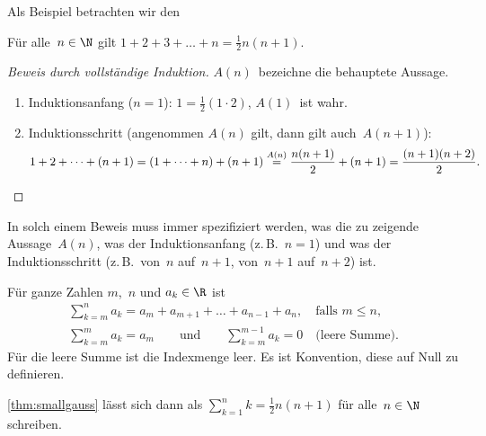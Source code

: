 \documentclass[a4paper]{article}
\begin{document}
Als Beispiel betrachten wir den

\begin{theorem}\label{thm:smallgauss}
    Für alle~$n \in \N$ gilt $1 + 2 + 3 + \dots + n = \frac{1}{2} n (n + 1)$.
\end{theorem}

\begin{proof}[Beweis durch vollständige Induktion]
    $A(n)$~bezeichne die behauptete Aussage.

    \begin{enumerate}
        \item Induktionsanfang ($n = 1$): $1 = \frac{1}{2} (1 \cdot 2)$, $A(1)$~ist wahr.
        \item Induktionsschritt (angenommen $A(n)$ gilt, dann gilt auch~$A(n + 1)$):
              \begin{equation*}
                  1 + 2 + \dots + (n + 1) = (1 + \dots + n) + (n + 1) \overset{A(n)}{=} \frac{n (n + 1)}{2} + (n + 1) = \frac{(n + 1) (n + 2)}{2}. \qedhere
              \end{equation*}
    \end{enumerate}
\end{proof}

\begin{remark}
    In solch einem Beweis muss immer spezifiziert werden, was die zu zeigende Aussage~$A(n)$, was der Induktionsanfang (z.\,B.~$n = 1$) und was der Induktionsschritt (z.\,B.\ von~$n$ auf~$n + 1$, von~$n + 1$ auf~$n + 2$) ist.
\end{remark}

\begin{notation}[Summenzeichen]
    Für ganze Zahlen $m$,~$n$ und $a_k \in \R$ ist
    \begin{gather*}
        \sum_{k=m}^n a_k = a_m + a_{m+1} + \dots + a_{n-1} + a_n, \quad\text{falls } m \leq n, \\
        \sum_{k=m}^m a_k = a_m \qquad\text{und}\qquad \sum_{k=m}^{m-1} a_k = 0 \quad\text{(leere Summe)}.
    \end{gather*}
    Für die leere Summe ist die Indexmenge leer. Es ist Konvention, diese auf Null zu definieren.
\end{notation}

\begin{example}
    \cref{thm:smallgauss} lässt sich dann als $\sum_{k=1}^n k = \frac{1}{2}n(n+1)$ für alle~$n \in \N$ schreiben.
\end{example}
\end{document}
